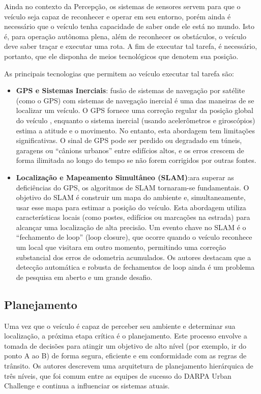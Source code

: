 Ainda no contexto da Percepção, os sistemas de sensores servem para que o veículo seja capaz de reconhecer e operar em seu entorno, porém ainda é necessário que o veículo tenha capacidade de saber onde ele está no mundo. Isto é, para operação autônoma plena, além de reconhecer os obstáculos, o veículo deve saber traçar e executar uma rota. A fim de executar tal tarefa, é necessário, portanto, que ele disponha de meios tecnológicos que denotem sua posição.

As principais tecnologias que permitem ao veículo executar tal tarefa são:
\begin{itemize}
    \item \textbf{GPS e Sistemas Inerciais}: fusão de sistemas de navegação por satélite (como o GPS) com sistemas de navegação inercial é uma das maneiras de se localizar um veículo. O GPS fornece uma correção regular da posição global do veículo , enquanto o sistema inercial (usando acelerômetros e giroscópios) estima a atitude e o movimento. No entanto, esta abordagem tem limitações significativas. O sinal de GPS pode ser perdido ou degradado em túneis, garagens ou ``cânions urbanos'' entre edifícios altos, e os erros crescem de forma ilimitada ao longo do tempo se não forem corrigidos por outras fontes.
    \item \textbf{Localização e Mapeamento Simultâneo (SLAM)}:ara superar as deficiências do GPS, os algoritmos de SLAM tornaram-se fundamentais. O objetivo do SLAM é construir um mapa do ambiente e, simultaneamente, usar esse mapa para estimar a posição do veículo. Esta abordagem utiliza características locais (como postes, edifícios ou marcações na estrada) para alcançar uma localização de alta precisão. Um evento chave no SLAM é o ``fechamento de loop'' (loop closure), que ocorre quando o veículo reconhece um local que visitara em outro momento, permitindo uma correção substancial dos erros de odometria acumulados. Os autores destacam que a detecção automática e robusta de fechamentos de loop ainda é um problema de pesquisa em aberto e um grande desafio.
\end{itemize}

\subsection{Planejamento}

Uma vez que o veículo é capaz de perceber seu ambiente e determinar sua localização, a próxima etapa crítica é o planejamento. Este processo envolve a tomada de decisões para atingir um objetivo de alto nível (por exemplo, ir do ponto A ao B) de forma segura, eficiente e em conformidade com as regras de trânsito. Os autores descrevem uma arquitetura de planejamento hierárquica de três níveis, que foi comum entre as equipes de sucesso do DARPA Urban Challenge e continua a influenciar os sistemas atuais.

